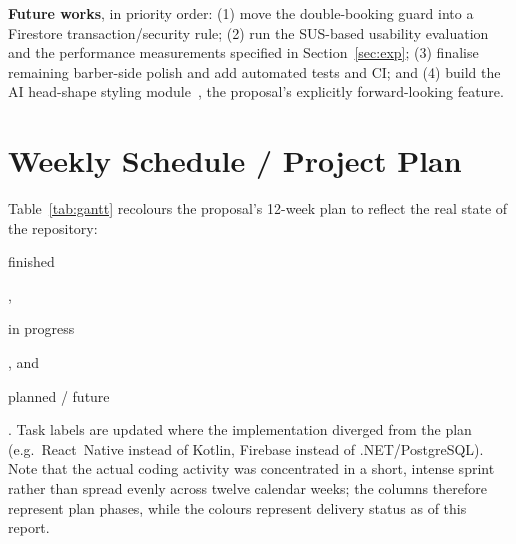 \documentclass[14pt]{article}
\begin{document}
\textbf{Future works}, in priority order: (1) move the double-booking
guard into a Firestore transaction/security rule; (2) run the SUS-based
usability evaluation~\citep{nielsen1994usability} and the performance
measurements specified in Section~\ref{sec:exp}; (3) finalise remaining
barber-side polish and add automated tests and CI; and (4) build the AI
head-shape styling module~\citep{viola2001rapid}, the proposal's
explicitly forward-looking feature.

\section{Weekly Schedule / Project Plan}
Table~\ref{tab:gantt} recolours the proposal's 12-week plan to reflect
the real state of the repository:
\colorbox{doneG}{\strut finished},
\colorbox{progB}{\strut in progress}, and
\colorbox{planY}{\strut planned / future}. Task labels are updated where
the implementation diverged from the plan (e.g.\ React~Native instead of
Kotlin, Firebase instead of .NET/PostgreSQL). Note that the actual coding
activity was concentrated in a short, intense sprint rather than spread
evenly across twelve calendar weeks; the columns therefore represent
plan phases, while the colours represent delivery status as of this
report.
\end{document}
